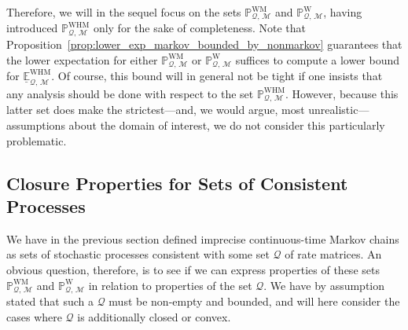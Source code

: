 \documentclass[10pt,a4paper]{paper}
\theoremstyle{definition}
\newcommand{\processes}{\mathbb{P}}
\newcommand{\wprocesses}{\processes^{\mathrm{W}}}
\newcommand{\wmprocesses}{\processes^{\mathrm{WM}}}
\newcommand{\whmprocesses}{\processes^{\mathrm{WHM}}}
\newcommand{\rateset}{\mathcal{Q}}
\begin{document}
Therefore, we will in the sequel focus on the sets $\wmprocesses_{\rateset,\,\mathcal{M}}$ and $\wprocesses_{\rateset,\,\mathcal{M}}$, having introduced $\whmprocesses_{\rateset,\,\mathcal{M}}$ only for the sake of completeness. Note that Proposition~\ref{prop:lower_exp_markov_bounded_by_nonmarkov} guarantees that the lower expectation for either $\wmprocesses_{\rateset,\,\mathcal{M}}$ or $\wprocesses_{\rateset,\,\mathcal{M}}$ suffices to compute a lower bound for $\underline{\mathbb{E}}_{\rateset,\,\mathcal{M}}^\mathrm{WHM}$. Of course, this bound will in general not be tight if one insists that any analysis should be done with respect to the set $\whmprocesses_{\rateset,\,\mathcal{M}}$. However, because this latter set does make the strictest---and, we would argue, most unrealistic---assumptions about the domain of interest, we do not consider this particularly problematic.

\subsection{Closure Properties for Sets of Consistent Processes}

We have in the previous section defined imprecise continuous-time Markov chains as sets of stochastic processes consistent with some set $\rateset$ of rate matrices. An obvious question, therefore, is to see if we can express properties of these sets $\wmprocesses_{\rateset,\,\mathcal{M}}$ and $\wprocesses_{\rateset,\,\mathcal{M}}$ in relation to properties of the set $\rateset$. We have by assumption stated that such a $\rateset$ must be non-empty and bounded, and will here consider the cases where $\rateset$ is additionally closed or convex.
\end{document}
